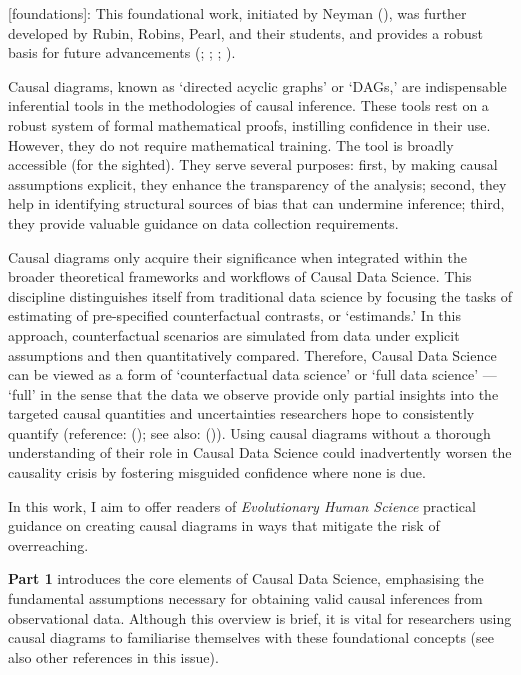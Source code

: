 \documentclass[
  singlecolumn,
  9pt]{article}
\begin{document}
{[}foundations{]}: This foundational work, initiated by Neyman
(), was further developed
by Rubin, Robins, Pearl, and their students, and provides a robust basis
for future advancements (; ;
; ).

Causal diagrams, known as `directed acyclic graphs' or `DAGs,' are
indispensable inferential tools in the methodologies of causal
inference. These tools rest on a robust system of formal mathematical
proofs, instilling confidence in their use. However, they do not require
mathematical training. The tool is broadly accessible (for the sighted).
They serve several purposes: first, by making causal assumptions
explicit, they enhance the transparency of the analysis; second, they
help in identifying structural sources of bias that can undermine
inference; third, they provide valuable guidance on data collection
requirements.

Causal diagrams only acquire their significance when integrated within
the broader theoretical frameworks and workflows of Causal Data Science.
This discipline distinguishes itself from traditional data science by
focusing the tasks of estimating of pre-specified counterfactual
contrasts, or `estimands.' In this approach, counterfactual scenarios
are simulated from data under explicit assumptions and then
quantitatively compared. Therefore, Causal Data Science can be viewed as
a form of `counterfactual data science' or `full data science' ---
`full' in the sense that the data we observe provide only partial
insights into the targeted causal quantities and uncertainties
researchers hope to consistently quantify (reference:
(); see also:
()). Using causal
diagrams without a thorough understanding of their role in Causal Data
Science could inadvertently worsen the causality crisis by fostering
misguided confidence where none is due.

In this work, I aim to offer readers of \emph{Evolutionary Human
Science} practical guidance on creating causal diagrams in ways that
mitigate the risk of overreaching.

\textbf{Part 1} introduces the core elements of Causal Data Science,
emphasising the fundamental assumptions necessary for obtaining valid
causal inferences from observational data. Although this overview is
brief, it is vital for researchers using causal diagrams to familiarise
themselves with these foundational concepts (see also other references
in this issue).
\end{document}
